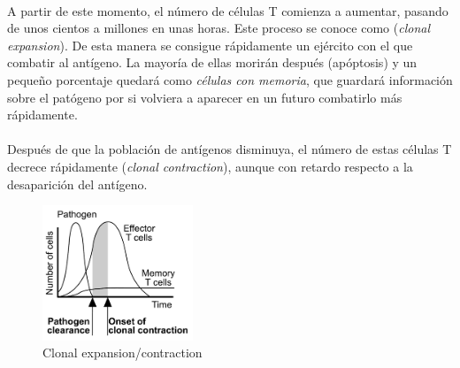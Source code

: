 \documentclass{article}
\begin{document}
 	 \\
 	 A partir de este momento, el número de células T comienza a aumentar, pasando de unos cientos a millones en unas horas. Este proceso se conoce como (\textit{clonal expansion}). De esta manera se consigue rápidamente un ejército con el que combatir al antígeno. La mayoría de ellas morirán después (apóptosis) y un pequeño porcentaje quedará como \textit{células con memoria}, que guardará información sobre el patógeno por si volviera a aparecer en un futuro combatirlo más rápidamente.
 	 \\
 	 \\
 	 Después de que la población de antígenos disminuya, el número de estas células T decrece rápidamente (\textit{clonal contraction}), aunque con retardo respecto a la desaparición del antígeno.
 	 
 	 \begin{figure}[h!]
 	 	\centering
 	 	\includegraphics[width=0.4\textwidth]{clonalExpContr}
 	 	\caption{Clonal expansion/contraction}
 	 	\label{fig:ejemplo}
 	 \end{figure}
	 
\end{document}
